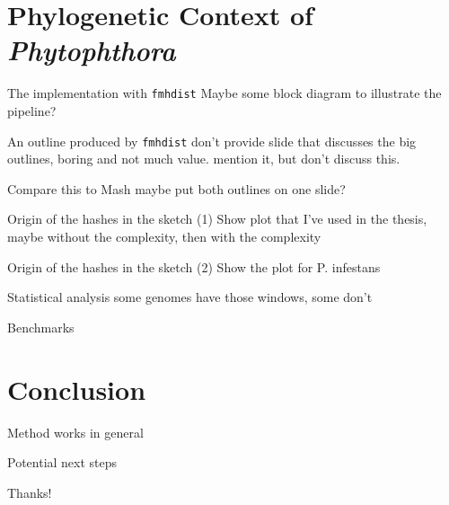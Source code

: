 \documentclass[aspectratio=169]{beamer}
\begin{document}
\section{Phylogenetic Context of \textit{Phytophthora}}
\begin{frame}{The implementation with \texttt{fmhdist}}
    Maybe some block diagram to illustrate the pipeline?
\end{frame}

\begin{frame}{An outline produced by \texttt{fmhdist}} 
    don't provide slide that
    discusses the big outlines, boring and not much value. mention it, but don't discuss this.
\end{frame}

\begin{frame}{Compare this to Mash}
    maybe put both outlines on one slide?
\end{frame}

\begin{frame}{Origin of the hashes in the sketch (1)}
    Show plot that I've used in the thesis, maybe without the complexity, then
    with the complexity
\end{frame}

\begin{frame}{Origin of the hashes in the sketch (2)}
    Show the plot for P. infestans
\end{frame}

\begin{frame}{Statistical analysis}
    some genomes have those windows, some don't
\end{frame}

\begin{frame}{Benchmarks}

\end{frame}

\section{Conclusion}
\begin{frame}{Method works in general}

\end{frame}

\begin{frame}{Potential next steps}
    
\end{frame}

\begin{frame}[standout]
    Thanks!
\end{frame}
\end{document}
